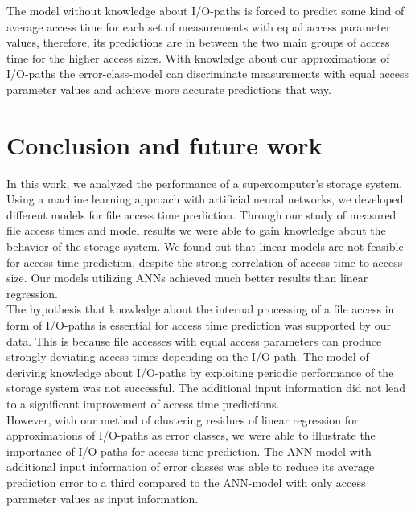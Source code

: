 \documentclass{superfri}
\begin{document}
The model without knowledge about I/O-paths is forced to predict some kind of average access time for each set of measurements with equal access parameter values, therefore, its predictions are in between the two main groups of access time for the higher access sizes.
With knowledge about our approximations of I/O-paths the error-class-model can discriminate measurements with equal access parameter values and achieve more accurate predictions that way.

\section{Conclusion and future work}
\label{conclusion}
In this work, we analyzed the performance of a supercomputer's storage system.
Using a machine learning approach with artificial neural networks, we developed different models for file access time prediction.
Through our study of measured file access times and model results we were able to gain knowledge about the behavior of the storage system.
We found out that linear models are not feasible for access time prediction, despite the strong correlation of access time to access size.
Our models utilizing ANNs achieved much better results than linear regression.\\
The hypothesis that knowledge about the internal processing of a file access in form of I/O-paths is essential for access time prediction was supported by our data.
This is because file accesses with equal access parameters can produce strongly deviating access times depending on the I/O-path. 
The model of deriving knowledge about I/O-paths by exploiting periodic performance of the storage system was not successful.
The additional input information did not lead to a significant improvement of access time predictions.\\
However, with our method of clustering residues of linear regression for approximations of I/O-paths as error classes, we were able to illustrate the importance of I/O-paths for access time prediction. The ANN-model with additional input information of error classes was able to reduce its average prediction error to a third compared to the ANN-model with only access parameter values as input information.\medskip
\end{document}
